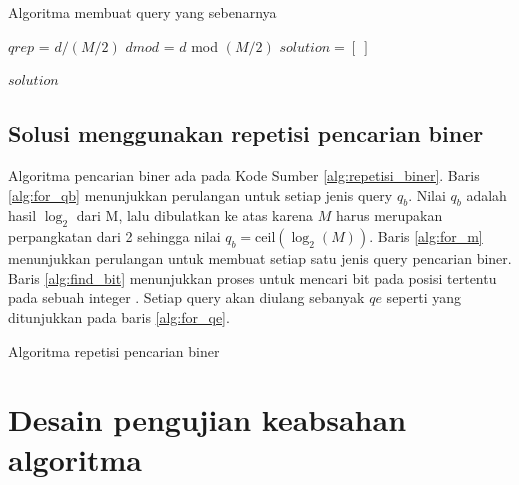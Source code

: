 \begin{algorithm}[h]
\caption{Algoritma membuat query yang sebenarnya}
\label{alg:actual_query}
  $qrep$ = $d/(M/2)$\;
  $dmod$ = $d$ mod $(M/2)$\;
  $solution = [\ ]$\;


  \Return $solution$\;
\end{algorithm}

\subsection{Solusi menggunakan repetisi pencarian biner}

Algoritma pencarian biner ada pada Kode Sumber \ref{alg:repetisi_biner}. Baris \ref{alg:for_qb} menunjukkan perulangan untuk setiap jenis query $q_b$. Nilai $q_b$ adalah hasil $\log_2$ dari M, lalu dibulatkan ke atas karena $M$ harus merupakan perpangkatan dari 2 sehingga nilai $q_b = \text{ceil}(\log_2(M))$. Baris \ref{alg:for_m} menunjukkan perulangan untuk membuat setiap satu jenis query pencarian biner. Baris \ref{alg:find_bit} menunjukkan proses untuk mencari bit pada posisi tertentu pada sebuah integer \cite{bithack}. Setiap query akan diulang sebanyak $qe$ seperti yang ditunjukkan pada baris \ref{alg:for_qe}.

\begin{algorithm}[h]
\caption{Algoritma repetisi pencarian biner}
\label{alg:repetisi_biner}
\end{algorithm}


\section{Desain pengujian keabsahan algoritma}

